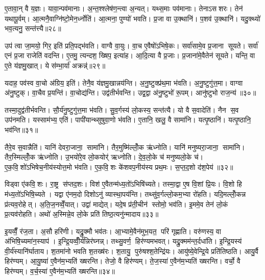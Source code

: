 ए॒तावा॒न् वै य॒ज्ञः। यावा॒न्पव॑मानाः। अ॒न्त॒श्श्लेष॑ण॒न्त्वा अ॒न्यत्। यथ्स॒माः पव॑मानाः। तेनाऽसशरः। तेन॑ यथापू॒र्वम्। आ॒त्मनै॒वाग्नि॑ष्टो॒मेन॒र्ध्नोति॑। आ॒त्मना॒ पुण्यो॑ भवति। प्र॒जा वा उ॒क्थानि॑। प॒शव॑ उ॒क्थानि॑। यदु॒क्थ्यो॑ भव॒त्यनु॒ सन्त॑त्त्यै॥२८॥\anuvakamend[स्तोमा प॒शव॑ उ॒क्थान्येक॑ञ्च]

उप॑ त्वा जा॒मयो॒ गिर॒ इति॑ प्रति॒पद्भ॑वति। वाग्वै वा॒युः। वा॒च ए॒वैषो॑ऽभिषे॒कः। सर्वा॑सामे॒व प्र॒जाना सूयते। सर्वा॑ एनं प्र॒जा राजेति॑ वदन्ति। ए॒तमु॒ त्यन्दश॒ ख्षिप॒ इत्या॑ह। आ॒दि॒त्या वै प्र॒जाः। प्र॒जाना॑मे॒वैतेन॑ सूयते। यन्ति॒ वा ए॒ते य॑ज्ञमु॒खात्। ये स॑म्भा॒र्या॑ अक्रन्न्॑॥२९॥

यदाह॒ पव॑स्व वा॒चो अ॑ग्रिय॒ इति॑। तेनै॒व य॑ज्ञमु॒खान्नय॑न्ति। अ॒नु॒ष्टुक्प्र॑थ॒मा भ॑वति। अ॒नु॒ष्टुगु॑त्त॒मा। वाग्वा अ॑नु॒ष्टुक्। वा॒चैव प्र॒यन्ति॑। वा॒चोद्य॑न्ति। उद्व॑तीर्भवन्ति। उद्व॒द्वा अ॑नु॒ष्टुभो॑ रू॒पम्। आनु॑ष्टुभो राज॒न्य॑॥३०॥

तस्मा॒दुद्व॑तीर्भवन्ति। सौ॒र्य॑नु॒ष्टुगु॑त्त॒मा भ॑वति। सु॒व॒र्गस्य॑ लो॒कस्य॒ सन्त॑त्यै। यो वै स॒वादेति॑। नैन स॒व उप॑नमति। यस्साम॑भ्य॒ एति॑। पापी॑यान्थ्सुषुवा॒णो भ॑वति। ए॒तानि॒ खलु॒ वै सामा॑नि। यत्पृ॒ष्ठानि॑। यत्पृ॒ष्ठानि॒ भव॑न्ति॥३१॥

तैरे॒व स॒वान्नैति॑। यानि॑ देवरा॒जाना॒ सामा॑नि। तैर॒मुष्मि॑ल्लोँ॒क ऋ॑ध्नोति। यानि॑ मनुष्यरा॒जाना॒ सामा॑नि। तैर॒स्मिल्लोँ॒क ऋ॑ध्नोति। उ॒भयो॑रे॒व लो॒कयोर्॑ ऋध्नोति। दे॒व॒लो॒के च॑ मनुष्यलो॒के च॑। ए॒क॒वि॒शो॑ऽभिषेच॒नीय॑स्योत्त॒मो भ॑वति। ए॒क॒वि॒शः के॑शवप॒नीय॑स्य प्रथ॒मः। स॒प्त॒द॒शो द॑श॒पेय॑॥३२॥

विड्वा ए॑कवि॒शः। रा॒ष्ट्र स॑प्तद॒शः। विश॑ ए॒वैतन्म॑ध्य॒तो॑ऽभिषि॑च्यते। तस्मा॒द्वा ए॒ष वि॒शां प्रि॒यः। वि॒शो हि म॑ध्य॒तो॑ऽभिषि॒च्यते। यद्वा ए॑नम॒दो दिशोऽनु॑ व्यास्था॒पय॑न्ति। तथ्सु॑व॒र्गल्लो॒कम॒भ्या रो॑हति। यदि॒मल्लोँ॒कन्न प्र॑त्यव॒रोहेत्। अ॒ति॒ज॒नव्वेँ॒यात्। उद्वा॑ माद्येत्। यदे॒ष प्र॑ती॒चीन॑ स्तोमो॒ भव॑ति। इ॒ममे॒व तेन॑ लो॒कं प्र॒त्यव॑रोहति। अथो॑ अ॒स्मिन्ने॒व लो॒के प्रति॑ तिष्ठ॒त्यनु॑न्मादाय॥३३॥\anuvakamend[अक्र॑न्राज॒न्यो॑ भव॑न्ति दश॒पेयो॑ माद्ये॒त्रीणि॑ च]

इ॒यव्वैँ॒ र॑ज॒ता। अ॒सौ हरि॑णी। यद्रु॒क्मौ भव॑तः। आ॒भ्यामे॒वैन॑मुभ॒यत॒ परि॑ गृह्णाति। वरु॑णस्य॒ वा अ॑भिषि॒च्यमा॑न॒स्याप॑। इ॒न्द्रि॒यव्वीँ॒र्य॑न्निर॑घ्नन्न्। तथ्सु॒वर्ण॒ हिर॑ण्यमभवत्। यद्रु॒क्मम॑न्त॒र्दधा॑ति। इ॒न्द्रि॒यस्य॑ वी॒र्य॑स्यानि॑र्घाताय। श॒तमा॑नो भवति श॒तख्ष॑रः। श॒तायु॒ पुरु॑षश्श॒तेन्द्रि॑यः। आयु॑ष्ये॒वेन्द्रि॒ये प्रति॑तिष्ठति। आयु॒र्वै हिर॑ण्यम्। आ॒यु॒ष्या॑ ए॒वैन॑म॒भ्यति॑ ख्षरन्ति। तेजो॒ वै हिर॑ण्यम्। ते॒ज॒स्या॑ ए॒वैन॑म॒भ्यति॑ ख्षरन्ति। वर्चो॒ वै हिर॑ण्यम्। व॒र्च॒स्या॑ ए॒वैन॑म॒भ्यति॑ ख्षरन्ति॥३४॥\anuvakamend[श॒तख्ष॑रो॒ऽष्टौ च॑]

